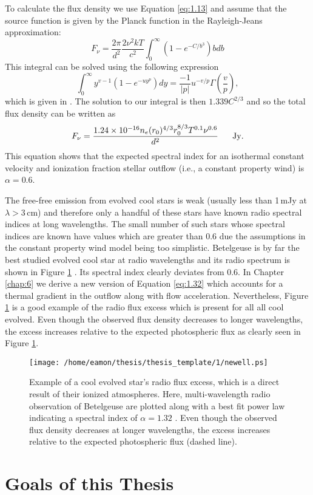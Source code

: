 To calculate the flux density we use Equation \ref{eq:1.13} and assume that the source function is given by the Planck function in the Rayleigh-Jeans approximation:
\begin{equation}
F_{\nu} = \frac{2\pi}{d^2}\frac{2\nu ^2 kT}{c^2} \int ^{\infty} _{0}(1-e^{-C/b^3})bdb
\end{equation}
This integral can be solved using the following expression
\begin{equation}
\int ^{\infty} _{0}y^{v-1}(1-e^{-uy^p})dy=\frac{-1}{|p|}u^{-v/p}\Gamma \left(\frac{v}{p} \right),
\end{equation}
which is given in \cite{gradshteyn_1994}. The solution to our integral is then $1.339C^{2/3}$ and so the total flux density can be written as 
\begin{equation}\label{eq:1.32}
F_{\nu} = \dfrac{1.24\times 10^{-16}n_e(r_0)^{4/3}r_0^{8/3}T^{0.1}\nu ^{0.6}}{d^2}\ \ \ \ \ \rm{Jy}.
\end{equation}
This equation shows that the expected spectral index for an isothermal constant velocity and ionization fraction stellar outflow (i.e., a constant property wind) is $\alpha =0.6$. 

The free-free emission from evolved cool stars is weak (usually less than 1\,mJy at $\lambda > 3$\,cm) and therefore only a handful of these stars have known radio spectral indices at long wavelengths. The small number of such stars whose spectral indices are known have values which are greater than 0.6 \citep[e.g.][]{drake_1986} due the assumptions in the constant property wind model being too simplistic. Betelgeuse is by far the best studied evolved cool star at radio wavelengths and its radio spectrum is shown in Figure \ref{fig:1.5.5} \citep{newell_1982}. Its spectral index clearly deviates from 0.6. In Chapter \ref{chap:6} we derive a new version of Equation \ref{eq:1.32} which accounts for a thermal gradient in the outflow along with flow acceleration. Nevertheless, Figure \ref{fig:1.5.5} is a good example of the radio flux excess which is present for all all cool evolved. Even though the observed flux density decreases to longer wavelengths, the excess increases relative to the expected photospheric flux as clearly seen in Figure \ref{fig:1.5.5}.

\begin{figure}[hbt!]\label{fig:1.5.4}
\centering 
          \texttt{[image: /home/eamon/thesis/thesis\_template/1/newell.ps]}
\caption[]{Example of a cool evolved star's radio flux excess, which is a direct result of their ionized atmospheres. Here, multi-wavelength radio observation of Betelgeuse are plotted along with a best fit power law indicating a spectral index of $\alpha = 1.32$ \citep{newell_1982}.  Even though the observed flux density decreases at longer wavelengths, the excess increases relative to the expected photospheric flux (dashed line).}
\label{fig:1.5.5}
\end{figure}
\section{Goals of this Thesis}
